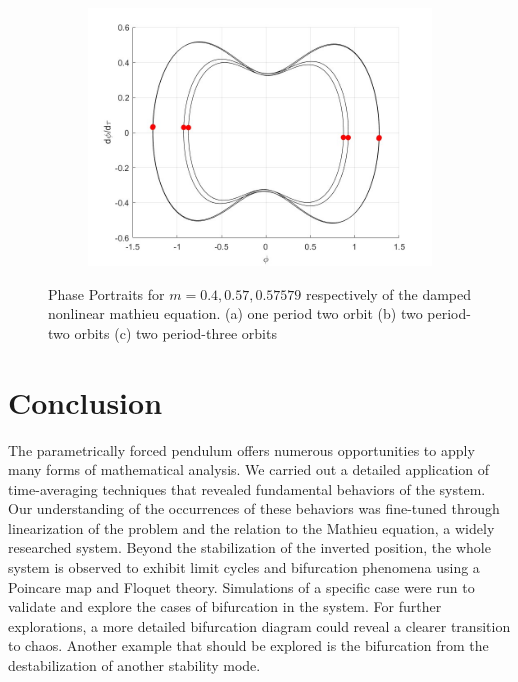 \documentclass[12pt, letterpaper]{article}
\begin{document}
\begin{figure}[h]
\begin{subfigure}[b]{0.32\textwidth}
        \includegraphics[width=\linewidth]{Bif_poincare_2_P3.jpg}
    \end{subfigure}
    \caption{Phase Portraits for $m = 0.4, 0.57,0.57579$ respectively of the damped nonlinear mathieu equation. (a) one period two orbit (b) two period-two orbits (c) two period-three orbits}
    \label{fig:phase_port_bif}
\end{figure}

\section{Conclusion}
The parametrically forced pendulum offers numerous opportunities to apply many forms of mathematical analysis. We carried out a detailed application of time-averaging techniques that revealed fundamental behaviors of the system. Our understanding of the occurrences of these behaviors was fine-tuned through linearization of the problem and the relation to the Mathieu equation, a widely researched system. Beyond the stabilization of the inverted position, the whole system is observed to exhibit limit cycles and bifurcation phenomena using a Poincare map and Floquet theory. Simulations of a specific case were run to validate and explore the cases of bifurcation in the system. For further explorations, a more detailed bifurcation diagram could reveal a clearer transition to chaos. Another example that should be explored is the bifurcation from the destabilization of another stability mode. 




\newpage


\newpage
\appendix
\end{document}
